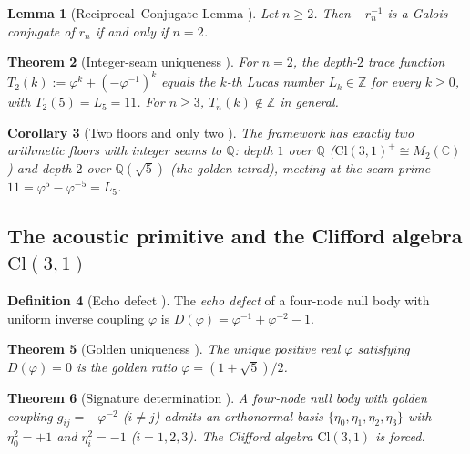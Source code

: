 \documentclass[11pt,a4paper]{article}
\theoremstyle{plain}
\newtheorem{theorem}{Theorem}[section]
\newtheorem{lemma}[theorem]{Lemma}
\newtheorem{corollary}[theorem]{Corollary}
\theoremstyle{definition}
\newtheorem{definition}[theorem]{Definition}
\theoremstyle{remark}
\numberwithin{equation}{section}
\providecommand{\Cl}{\mathrm{Cl}}
\providecommand{\C}{\mathbb{C}}
\providecommand{\Z}{\mathbb{Z}}
\providecommand{\Q}{\mathbb{Q}}
\providecommand{\vp}{\varphi}
\providecommand{\Lk}{L}
\begin{document}
\begin{lemma}[Reciprocal--Conjugate Lemma {\cite[Lem.~2.3]{paper-I-substrate}}]
\label{lem:reciprocal-conjugate}
Let $n \ge 2$.  Then $-r_n^{-1}$ is a Galois conjugate of $r_n$ if
and only if $n = 2$.
\end{lemma}

\begin{theorem}[Integer-seam uniqueness {\cite[Thm.~2.5]{paper-I-substrate}}]
\label{thm:integer-seam}
For $n = 2$, the depth-$2$ trace function $T_2(k) := \vp^k +
(-\vp^{-1})^k$ equals the $k$-th Lucas number $\Lk_k \in \Z$ for
every $k \ge 0$, with $T_2(5) = \Lk_5 = 11$.  For $n \ge 3$,
$T_n(k) \notin \Z$ in general.
\end{theorem}

\begin{corollary}[Two floors and only two {\cite[Cor.~2.6]{paper-I-substrate}}]
\label{cor:two-floor}
The framework has exactly two arithmetic floors with integer seams
to $\Q$: depth $1$ over $\Q$ ($\Cl(3,1)^+ \cong M_2(\C)$) and
depth $2$ over $\Q(\sqrt 5)$ (the golden tetrad), meeting at the
seam prime $11 = \vp^5 - \vp^{-5} = \Lk_5$.
\end{corollary}

\subsection{The acoustic primitive and the Clifford algebra $\Cl(3,1)$}

\begin{definition}[Echo defect {\cite[Def.~3.2]{paper-I-substrate}}]
\label{def:defect}
The \emph{echo defect} of a four-node null body with uniform
inverse coupling $\vp$ is $D(\vp) = \vp^{-1} + \vp^{-2} - 1$.
\end{definition}

\begin{theorem}[Golden uniqueness {\cite[Thm.~3.3]{paper-I-substrate}}]
\label{thm:golden-uniqueness}
The unique positive real $\vp$ satisfying $D(\vp) = 0$ is the
golden ratio $\vp = (1 + \sqrt 5)/2$.
\end{theorem}

\begin{theorem}[Signature determination {\cite[Thm.~3.4]{paper-I-substrate}}]
\label{thm:signature}
A four-node null body with golden coupling $g_{ij} = -\vp^{-2}$
($i \ne j$) admits an orthonormal basis $\{\eta_0, \eta_1, \eta_2,
\eta_3\}$ with $\eta_0^2 = +1$ and $\eta_i^2 = -1$ ($i = 1,2,3$).
The Clifford algebra $\Cl(3,1)$ is forced.
\end{theorem}
\end{document}
